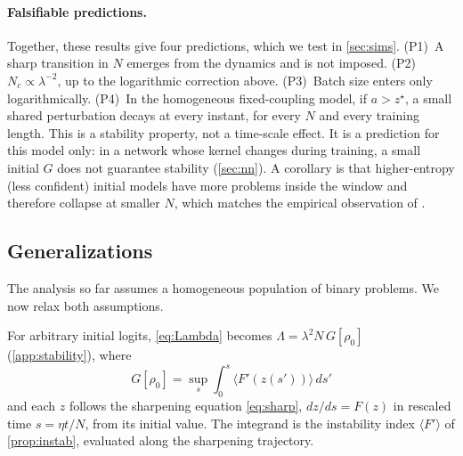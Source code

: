 \paragraph{Falsifiable predictions.}
Together, these results give four predictions, which we test in \cref{sec:sims}.
(P1)~A sharp transition in $N$ emerges from the dynamics and is not imposed.
(P2)~$N_c\propto\lambda^{-2}$, up to the logarithmic correction above.
(P3)~Batch size enters only logarithmically.
(P4)~In the homogeneous fixed-coupling model, if $a>z^\star$, a small shared perturbation decays at every instant, for every $N$ and every training length. This is a stability property, not a time-scale effect. It is a prediction for this model only: in a network whose kernel changes during training, a small initial $G$ does not guarantee stability (\cref{sec:nn}).
A corollary is that higher-entropy (less confident) initial models have more problems inside the window and therefore collapse at smaller $N$, which matches the empirical observation of \citet{he2026urlvr}.

\subsection{Generalizations}
\label{sec:general}
The analysis so far assumes a homogeneous population of binary problems. We now relax both assumptions.

For arbitrary initial logits, \cref{eq:Lambda} becomes $\Lambda=\lambda^2N\,G[\rho_0]$ (\cref{app:stability}), where
\begin{equation*}
  G[\rho_0]=\sup_s\int_0^s\langle F'(z(s'))\rangle\,ds'
\end{equation*}
and each $z$ follows the sharpening equation \cref{eq:sharp}, $dz/ds=F(z)$ in rescaled time $s=\eta t/N$, from its initial value.
The integrand is the instability index $\langle F'\rangle$ of \cref{prop:instab}, evaluated along the sharpening trajectory.

